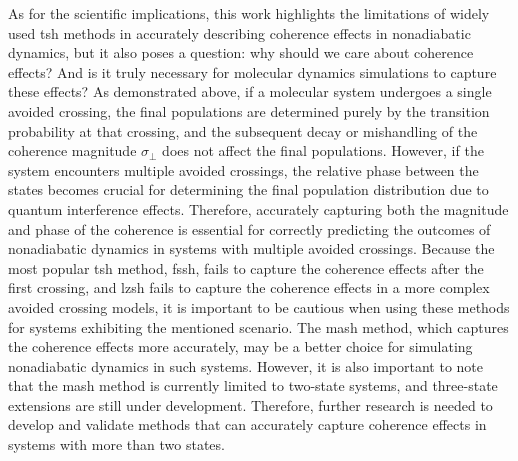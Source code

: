 As for the scientific implications, this work highlights the limitations of widely used \acrshort{tsh} methods in accurately describing coherence effects in nonadiabatic dynamics, but it also poses a question: why should we care about coherence effects? And is it truly necessary for molecular dynamics simulations to capture these effects? As demonstrated above, if a molecular system undergoes a single avoided crossing, the final populations are determined purely by the transition probability at that crossing, and the subsequent decay or mishandling of the coherence magnitude $\sigma_\perp$ does not affect the final populations. However, if the system encounters multiple avoided crossings, the relative phase between the states becomes crucial for determining the final population distribution due to quantum interference effects. Therefore, accurately capturing both the magnitude and phase of the coherence is essential for correctly predicting the outcomes of nonadiabatic dynamics in systems with multiple avoided crossings. Because the most popular \acrshort{tsh} method, \acrshort{fssh}, fails to capture the coherence effects after the first crossing, and \acrshort{lzsh} fails to capture the coherence effects in a more complex avoided crossing models, it is important to be cautious when using these methods for systems exhibiting the mentioned scenario. The \acrshort{mash} method, which captures the coherence effects more accurately, may be a better choice for simulating nonadiabatic dynamics in such systems. However, it is also important to note that the \acrshort{mash} method is currently limited to two-state systems, and three-state extensions are still under development. Therefore, further research is needed to develop and validate methods that can accurately capture coherence effects in systems with more than two states.
